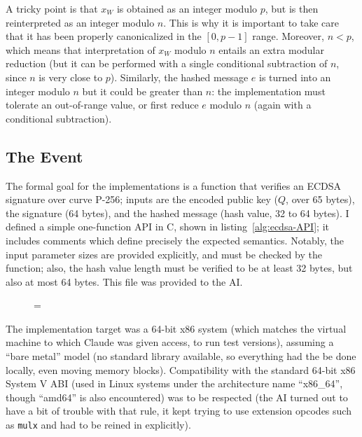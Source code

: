 \documentclass{llncs}
\newenvironment{forbidpagebreak}
    {\par\nobreak\vfil\penalty 0\vfilneg
     \vtop\bgroup}
    {\par\xdef\tpd{\the\prevdepth}\egroup
     \prevdepth=\tpd}
\begin{document}
A tricky point is that $x_W$ is obtained as an integer modulo $p$, but
is then reinterpreted as an integer modulo $n$. This is why it is
important to take care that it has been properly canonicalized in the
$[0,p-1]$ range. Moreover, $n < p$, which means that interpretation of
$x_W$ modulo $n$ entails an extra modular reduction (but it can be
performed with a single conditional subtraction of $n$, since $n$ is
very close to $p$). Similarly, the hashed message $e$ is turned into an
integer modulo $n$ but it could be greater than $n$: the implementation
must tolerate an out-of-range value, or first reduce $e$ modulo $n$
(again with a conditional subtraction).

\subsection{The Event}

The formal goal for the implementations is a function that verifies an
ECDSA signature over curve P-256; inputs are the encoded public key
($Q$, over 65 bytes), the signature (64 bytes), and the hashed message
(hash value, 32 to 64 bytes). I defined a simple one-function API in
C, shown in listing~\ref{alg:ecdsa-API}; it includes comments which
define precisely the expected semantics. Notably, the input parameter
sizes are provided explicitly, and must be checked by the function;
also, the hash value length must be verified to be at least 32 bytes,
but also at most 64 bytes. This file was provided to the AI.

\begin{figure}
\begin{forbidpagebreak}

\end{forbidpagebreak}
\end{figure}

The implementation target was a 64-bit x86 system (which matches the
virtual machine to which Claude was given access, to run test versions),
assuming a ``bare metal'' model (no standard library available, so
everything had the be done locally, even moving memory blocks).
Compatibility with the standard 64-bit x86 System V ABI (used in Linux
systems under the architecture name ``x86\_64'', though ``amd64'' is
also encountered) was to be respected (the AI turned out to have a bit
of trouble with that rule, it kept trying to use extension opcodes such
as \verb+mulx+ and had to be reined in explicitly).
\end{document}
